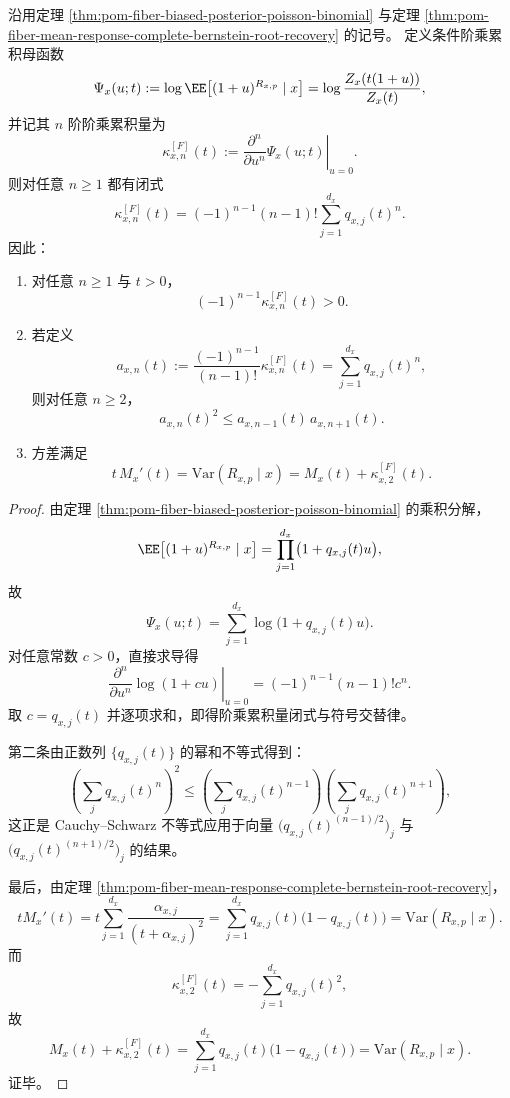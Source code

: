 \begin{theorem}\label{thm:pom-fiber-factorial-cumulants-sign-logconvex}
沿用定理 \ref{thm:pom-fiber-biased-posterior-poisson-binomial} 与定理
\ref{thm:pom-fiber-mean-response-complete-bernstein-root-recovery} 的记号。
定义条件阶乘累积母函数
\[
\Psi_x(u;t):=
\log\EE\!\left[(1+u)^{R_{x,p}}\mid x\right]
=
\log\frac{Z_x(t(1+u))}{Z_x(t)},
\]
并记其 \(n\) 阶阶乘累积量为
\[
\kappa^{[F]}_{x,n}(t)
:=
\left.\frac{\partial^n}{\partial u^n}\Psi_x(u;t)\right|_{u=0}.
\]
则对任意 \(n\ge 1\) 都有闭式
\[
\kappa^{[F]}_{x,n}(t)
=
(-1)^{n-1}(n-1)!\sum_{j=1}^{d_x}q_{x,j}(t)^n.
\]
因此：
\begin{enumerate}
  \item 对任意 \(n\ge 1\) 与 \(t>0\)，
  \[
  (-1)^{n-1}\kappa^{[F]}_{x,n}(t)>0.
  \]
  \item 若定义
  \[
  a_{x,n}(t):=\frac{(-1)^{n-1}}{(n-1)!}\kappa^{[F]}_{x,n}(t)
  =
  \sum_{j=1}^{d_x}q_{x,j}(t)^n,
  \]
  则对任意 \(n\ge 2\)，
  \[
  a_{x,n}(t)^2\le a_{x,n-1}(t)\,a_{x,n+1}(t).
  \]
  \item 方差满足
  \[
  t\,M_x'(t)
  =
  \mathrm{Var}(R_{x,p}\mid x)
  =
  M_x(t)+\kappa^{[F]}_{x,2}(t).
  \]
\end{enumerate}
\end{theorem}
\begin{proof}
由定理 \ref{thm:pom-fiber-biased-posterior-poisson-binomial} 的乘积分解，
\[
\EE\!\left[(1+u)^{R_{x,p}}\mid x\right]
=
\prod_{j=1}^{d_x}\bigl(1+q_{x,j}(t)u\bigr),
\]
故
\[
\Psi_x(u;t)
=
\sum_{j=1}^{d_x}\log\bigl(1+q_{x,j}(t)u\bigr).
\]
对任意常数 \(c>0\)，直接求导得
\[
\left.\frac{\partial^n}{\partial u^n}\log(1+cu)\right|_{u=0}
=
(-1)^{n-1}(n-1)!c^n.
\]
取 \(c=q_{x,j}(t)\) 并逐项求和，即得阶乘累积量闭式与符号交替律。

第二条由正数列 \(\{q_{x,j}(t)\}\) 的幂和不等式得到：
\[
\left(\sum_j q_{x,j}(t)^n\right)^2
\le
\left(\sum_j q_{x,j}(t)^{n-1}\right)
\left(\sum_j q_{x,j}(t)^{n+1}\right),
\]
这正是 Cauchy--Schwarz 不等式应用于向量
\(\bigl(q_{x,j}(t)^{(n-1)/2}\bigr)_j\) 与 \(\bigl(q_{x,j}(t)^{(n+1)/2}\bigr)_j\) 的结果。

最后，由定理 \ref{thm:pom-fiber-mean-response-complete-bernstein-root-recovery}，
\[
tM_x'(t)
=
t\sum_{j=1}^{d_x}\frac{\alpha_{x,j}}{(t+\alpha_{x,j})^2}
=
\sum_{j=1}^{d_x}q_{x,j}(t)\bigl(1-q_{x,j}(t)\bigr)
=
\mathrm{Var}(R_{x,p}\mid x).
\]
而
\[
\kappa^{[F]}_{x,2}(t)=-\sum_{j=1}^{d_x}q_{x,j}(t)^2,
\]
故
\[
M_x(t)+\kappa^{[F]}_{x,2}(t)
=
\sum_{j=1}^{d_x}q_{x,j}(t)\bigl(1-q_{x,j}(t)\bigr)
=
\mathrm{Var}(R_{x,p}\mid x).
\]
证毕。
\end{proof}

